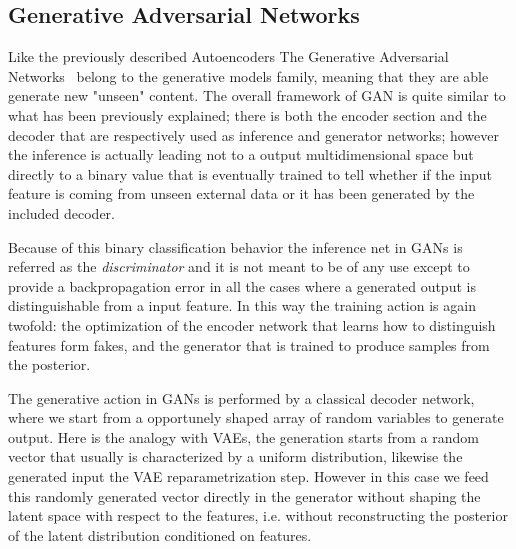 %
\subsection{Generative Adversarial Networks}
%
Like the previously described Autoencoders The Generative Adversarial Networks~\cite{goodfellow2014generative} belong to the generative models family, meaning that they are able generate new "unseen" content. The overall framework of GAN is quite similar to what has been previously explained; there is both the encoder section and the decoder that are respectively used as inference and generator networks; however the inference is actually leading not to a output multidimensional space but directly to a binary value that is eventually trained to tell whether if the input feature is coming from unseen external data or it has been generated by the included decoder.

Because of this binary classification behavior the inference net in GANs is referred as the \textit{discriminator} and it is not meant to be of any use except to provide a backpropagation error in all the cases where a generated output is distinguishable from a input feature. In this way the training action is again twofold: the optimization of the encoder network that learns how to distinguish features form fakes, and the generator that is trained to produce samples from the posterior.

The generative action in GANs is performed by a classical decoder network, where we start from a opportunely shaped array of random variables to generate output. Here is the analogy with VAEs, the generation starts from a random vector that usually is characterized by a uniform distribution, likewise the generated input the VAE reparametrization step. However in this case we feed this randomly generated vector directly in the generator without shaping the latent space with respect to the features, i.e. without reconstructing the posterior of the latent distribution conditioned on features.

